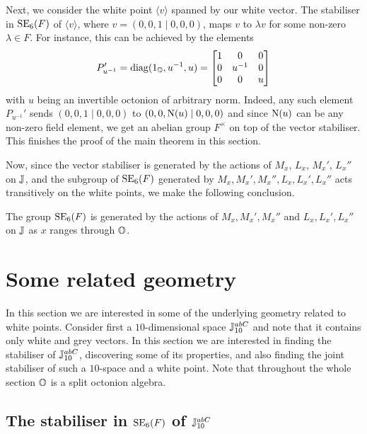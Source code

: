 Next, we consider the white point $\langle v \rangle$ spanned by our white vector. The stabiliser
in $\mathrm{SE}_6(F)$ of $\langle v \rangle$, where $v = (0,0,1\mid 0,0,0)$, maps 
$v$ to $\lambda v$ for some non-zero 
$\lambda \in F$. For instance, this can be achieved by the elements 
\begin{equation}
	\label{eq:puprime}
	P_{u^{-1}}' = \mathrm{diag}(1_{\mathbb{O}},u^{-1},u) = \begin{bmatrix}
		1 & 0 & 0 \\
		0 & u^{-1} & 0 \\
		0 & 0 & u
	\end{bmatrix}	 
\end{equation}
with 
$u$ being an invertible octonion of arbitrary norm. 
Indeed, any such element $P_{u^{-1}}'$ sends
$(0,0,1\mid 0,0,0)$ to $(0,0,\mathord{\mathrm{N}}(u)\mid 0,0,0)$ and since $\mathord{\mathrm{N}}(u)$ can be any non-zero 
field element, we get an abelian group $F^{\times}$ on top of the vector stabiliser. This finishes
the proof of the main theorem in this section. 

Now, since the vector stabiliser is generated by the actions of $M_x$, $L_x$, $M_x'$,
$L_x''$ on $\mathbb{J}$, and the subgroup of $\mathrm{SE}_6(F)$ generated by 
$M_x,M_x',M_x'',L_x,L_x',L_x''$ acts transitively on the white points, 
we make the following conclusion. 

\begin{theorem}
The group $\mathrm{SE}_6(F)$ is generated by the actions
of $M_x,M_x',M_x''$ and $L_x,L_x',L_x''$ on $\mathbb{J}$ as $x$ ranges through $\mathbb{O}$. 
\end{theorem}

\section{Some related geometry}

In this section we are interested in some of the underlying geometry related to white 
points. Consider first a $10$-dimensional
space $\mathbb{J}_{10}^{abC}$ and note that it 
contains only white and grey vectors. In this section we are interested in finding the 
stabiliser of $\mathbb{J}_{10}^{abC}$, discovering some of its properties, and also finding
the joint stabiliser of such a $10$-space and a white point. 
Note that throughout the whole section $\mathbb{O}$ is a split 
octonion algebra. 

\subsection{The stabiliser in $\mathrm{SE}_6(F)$ of $\mathbb{J}_{10}^{abC}$}

